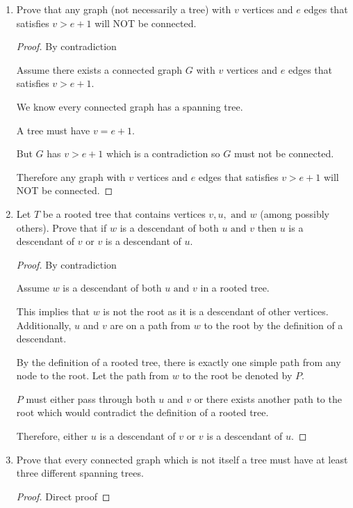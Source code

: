 \documentclass[11pt, letterpaper, includehead]{article}
\theoremstyle{plain}
\theoremstyle{mydefinition}
\theoremstyle{myproperty}
\begin{document}
\begin{enumerate}[label=\textbf{\arabic*}., leftmargin=*]
    \item Prove that any graph (not necessarily a tree) with $v$ vertices and $e$ edges that satisfies $v > e + 1$ will NOT be connected.

    \begin{proof} By contradiction

        Assume there exists a connected graph $G$ with $v$ vertices and $e$ edges that satisfies $v > e + 1$.
    
        We know every connected graph has a spanning tree.

        A tree must have $v = e + 1$.

        But $G$ has $v > e + 1$ which is a contradiction so $G$ must not be connected.

        Therefore any graph with $v$ vertices and $e$ edges that satisfies $v > e + 1$ will NOT be connected.
    \end{proof}

    \item Let $T$ be a rooted tree that contains vertices $v, u, \text{ and } w$ (among possibly others). Prove that if $w$ is a descendant of both $u \text{ and } v$ then $u$ is a descendant of $v$ or $v$ is a descendant of $u$.
    
    \begin{proof} By contradiction

        Assume $w$ is a descendant of both $u \text{ and } v$ in a rooted tree.

        This implies that $w$ is not the root as it is a descendant of other vertices. Additionally, $u$ and $v$ are on a path from $w$ to the root by the definition of a descendant.

        By the definition of a rooted tree, there is exactly one simple path from any node to the root. Let the path from $w$ to the root be denoted by $P$.
    
        $P$ must either pass through both $u$ and $v$ or there exists another path to the root which would contradict the definition of a rooted tree.

        Therefore, either $u$ is a descendant of $v$ or $v$ is a descendant of $u$.    
    \end{proof}
    
    \item Prove that every connected graph which is not itself a tree must have at least three different spanning trees.

    \begin{proof} Direct proof


\end{proof}
\end{enumerate}
\end{document}
